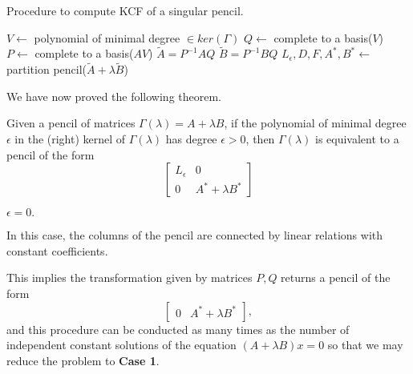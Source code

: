 \begin{cs}
    \pagebreak

    \begin{algorithm}
        \caption{Procedure to compute KCF of a singular pencil.}\label{alg:kcf-singular}
        $V \gets $ polynomial of minimal degree $\in ker(\Gamma)$\;
        $Q \gets $ complete to a basis($V$)\;
        $P \gets $ complete to a basis($AV$)\;
        $\tilde{A} = P^{-1}AQ$\;
        $\tilde{B} = P^{-1}BQ$\;
        $L_{\epsilon}, D, F, A^*, B^* \gets $ partition pencil($\tilde{A} + \lambda \tilde{B}$)\;
        {\;}
    \end{algorithm}

    We have now proved the following theorem.
    \begin{theorem}
        Given a pencil of matrices \(\Gamma(\lambda) = A + \lambda B\), if the polynomial of minimal degree \(\epsilon\)
        in the (right) kernel of \(\Gamma(\lambda)\) has degree \(\epsilon > 0\), then \(\Gamma(\lambda)\) is equivalent
        to a pencil of the form
        \[
            \begin{bmatrix}
                L_{\epsilon} & 0 \\
                0 & A^* + \lambda B^*
            \end{bmatrix}
        \]
    \end{theorem}
    \case \(\epsilon = 0.\)

    In this case, the columns of the pencil are connected by linear relations with constant coefficients.

    This implies the transformation given by matrices \(P, Q\) returns a pencil of the form
    \[
        \begin{bmatrix}
            0 & A^* + \lambda B^*
        \end{bmatrix},
    \]
    and this procedure can be conducted as many times as the number of independent constant solutions of the
    equation \((A + \lambda B)x = 0\) so that we may reduce the problem to \textbf{Case 1}.
\end{cs}